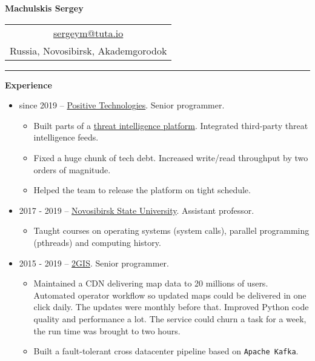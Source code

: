 \documentclass[final]{letter}
\def\code#1{\texttt{#1}}
\begin{document}
\begin{center}

{\fontsize{25}{40}\selectfont\bf{Machulskis Sergey}}
  {\hfill
    \begin{tabular}{c}
        \href{mailto:sergeym@tuta.io}{sergeym@tuta.io}\\
        Russia, Novosibirsk, Akademgorodok
     \end{tabular}
  }
\rule{.98\textwidth}{1pt}

\addvspace{.1cm}

\end{center}

{\bf Experience}
\begin{itemize}
  \item since 2019 -- \href{https://www.ptsecurity.com/ww-en/}{Positive Technologies}. Senior programmer.
  \begin{itemize}
    \item Built parts of a \href{https://www.ptsecurity.com/ru-ru/products/cybersecurity-intelligence/}{threat intelligence platform}. Integrated third-party threat intelligence feeds.
    \item Fixed a huge chunk of tech debt. Increased write/read throughput by two orders of magnitude.
    \item Helped the team to release the platform on tight schedule.
  \end{itemize}
  \item 2017 - 2019 -- \href{http://fit.nsu.ru/}{Novosibirsk State University}. Assistant professor.
    \begin{itemize}
      \item Taught courses on operating systems (system calls), parallel programming (pthreads) and computing history.
    \end{itemize}
  \item 2015 - 2019 -- \href{https://2gis.com}{2GIS}. Senior programmer.
  \begin{itemize}
    \item Maintained a CDN delivering map data to 20 millions of users.
      Automated operator workflow so updated maps could be delivered in one click daily.
      The updates were monthly before that.
      Improved Python code quality and performance a lot.
       The service could churn a task for a week, the run time was brought to two hours.
    \item Built a fault-tolerant cross datacenter pipeline based on \code{Apache Kafka}.

\end{itemize}
\end{itemize}
\end{document}
